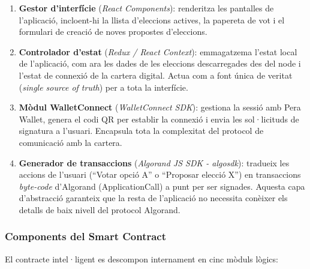 \begin{enumerate}[label=\roman*.]
    \item \textbf{Gestor d'interfície} (\textit{React Components}): renderitza les pantalles de l'aplicació, incloent-hi la llista d'eleccions actives, la papereta de vot i el formulari de creació de noves propostes d'eleccions.
 
    \item \textbf{Controlador d'estat} (\textit{Redux / React Context}): emmagatzema l'estat local de l'aplicació, com ara les dades de les eleccions descarregades des del node i l'estat de connexió de la cartera digital. Actua com a font única de veritat (\textit{single source of truth}) per a tota la interfície.
 
    \item \textbf{Mòdul WalletConnect} (\textit{WalletConnect SDK}): gestiona la sessió amb Pera Wallet, genera el codi QR per establir la connexió i envia les sol·licituds de signatura a l'usuari. Encapsula tota la complexitat del protocol de comunicació amb la cartera.
 
    \item \textbf{Generador de transaccions} (\textit{Algorand JS SDK - algosdk}): tradueix les accions de l'usuari (``Votar opció A'' o ``Proposar elecció X'') en transaccions \textit{byte-code} d'Algorand (ApplicationCall) a punt per ser signades. Aquesta capa d'abstracció garanteix que la resta de l'aplicació no necessita conèixer els detalls de baix nivell del protocol Algorand.
\end{enumerate}
 
\subsubsection{Components del Smart Contract}
 
El contracte intel·ligent es descompon internament en cinc mòduls lògics:
 
